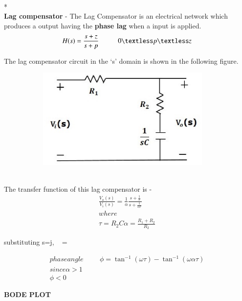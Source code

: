 \begin{enumerate}[label=\thesection.\arabic*.,ref=\thesection.\theenumi]
\begin{flushleft}
\\* \textbf{\\Lag compensator} - The Lag Compensator is an electrical network which produces a  output having the \textbf{phase lag} when a input is applied.
\begin{equation}
H(s) = \frac{s+z}{s+p}  \hspace{1cm} 0 \textless p \textless z
\centering
\end{equation}

 
The lag compensator circuit in the ‘s’ domain is shown in the following figure.
 
\begin{figure}[h]
 
\begin{subfigure}{0.5\textwidth}
\includegraphics[width=0.9\linewidth, height=5cm ,inner]{./figs/ee18btech11027/lag_compensator.eps} 
\label{fig:subim1}
\end{subfigure}
\end{figure}
\\
The transfer function of this lag compensator is -
\begin{align}
    \frac{V_o(s)}{V_i(s)} = \frac{1}{\alpha}  \frac{s + \frac{1}{\tau}}{s + \frac{1}{\alpha\tau}} \\
where\\
 \tau = R_2C  \alpha =\frac{R_1+R_2}{R_2}
\end{align}

substituting s=j\omega, \  =   

\begin{align}
phase angle \hspace{1cm}\phi = \tan^{-1} {(\omega\tau)} - \tan^{-1}{(\omega\alpha\tau)}\\
since \alpha > 1\\
\phi < 0
\end{align}

\textbf{BODE PLOT}
\begin{figure}[h]
 

\end{figure}
\end{flushleft}
\end{enumerate}
